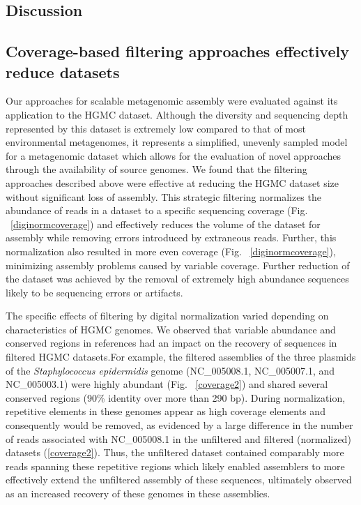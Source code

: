 \documentclass{pnastwo}
\begin{document}
\begin{article}
\section*{Discussion}
\subsection{Coverage-based filtering approaches effectively reduce datasets} 
Our approaches for scalable metagenomic assembly
were evaluated against its application to the HGMC dataset. Although the
diversity and sequencing depth represented by this dataset is extremely low
compared to that of most environmental metagenomes, it represents a simplified,
unevenly sampled model for a metagenomic dataset which allows for the evaluation
of novel approaches through the availability of source genomes. We found that
the filtering approaches described above were effective at reducing the HGMC
dataset size without significant loss of assembly. This strategic filtering
normalizes the abundance of reads in a dataset to a specific sequencing coverage
(Fig. ~\ref{diginormcoverage}) and effectively reduces the volume of the dataset for assembly while
removing errors introduced by extraneous reads. Further, this normalization also
resulted in more even coverage (Fig. ~\ref{diginormcoverage}), minimizing
assembly problems caused by variable coverage. Further reduction of the dataset
was achieved by the removal of extremely high abundance sequences likely to be
sequencing errors or artifacts.

The specific effects of filtering by digital normalization varied depending on
characteristics of HGMC genomes. We observed that variable abundance and
conserved regions in references had an impact on the recovery of sequences in
filtered HGMC datasets.For example, the filtered assemblies of the three
plasmids of the \emph{Staphylococcus epidermidis} genome (NC\_005008.1,
NC\_005007.1, and NC\_005003.1) were highly abundant (Fig. ~\ref{coverage2}) and shared
several conserved regions (90\% identity over more than 290 bp). During
normalization, repetitive elements in these genomes appear as high coverage
elements and consequently would be removed, as evidenced by a large difference
in the number of reads associated with NC\_005008.1 in the unfiltered and
filtered (normalized) datasets (\ref{coverage2}). Thus, the unfiltered dataset
contained comparably more reads spanning these repetitive regions which likely
enabled assemblers to more effectively extend the unfiltered assembly of these
sequences, ultimately observed as an increased recovery of these genomes in
these assemblies.


\end{article}
\end{document}
